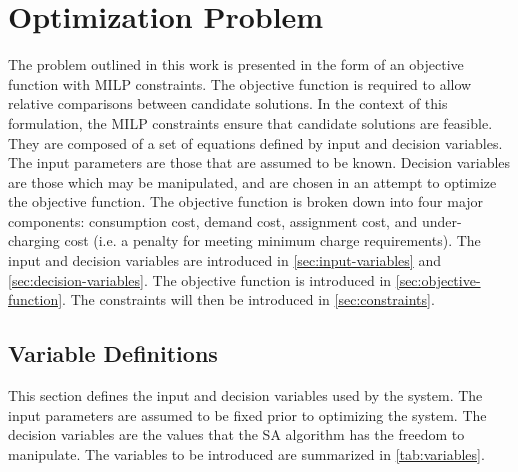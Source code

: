 \documentclass[11pt,a4paper,final]{article}
\begin{document}
\section{Optimization Problem}
\label{sec:optimization-problem}
The problem outlined in this work is presented in the form of an objective function with MILP constraints. The objective
function is required to allow relative comparisons between candidate solutions. In the context of this formulation, the
MILP constraints ensure that candidate solutions are feasible. They are composed of a set of equations defined by input
and decision variables. The input parameters are those that are assumed to be known. Decision variables are those which
may be manipulated, and are chosen in an attempt to optimize the objective function. The objective function is broken
down into four major components: consumption cost, demand cost, assignment cost, and under-charging cost (i.e. a penalty
for meeting minimum charge requirements). The input and decision variables are introduced in \ref{sec:input-variables} and
\ref{sec:decision-variables}. The objective function is introduced in \ref{sec:objective-function}. The constraints will then be
introduced in \ref{sec:constraints}.

\subsection{Variable Definitions}
\label{sec:parameter-definitions}
This section defines the input and decision variables used by the system. The input parameters are assumed to be fixed
prior to optimizing the system. The decision variables are the values that the SA algorithm has the freedom to
manipulate. The variables to be introduced are summarized in \ref{tab:variables}.
\end{document}
